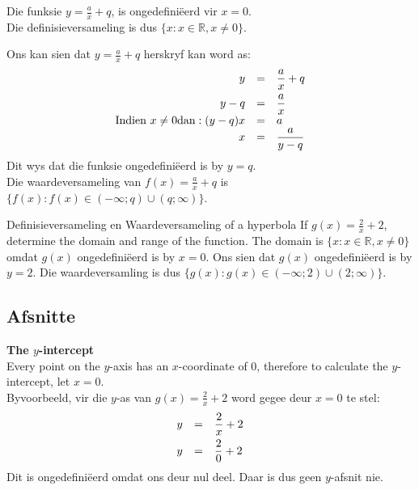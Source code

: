 Die funksie $y=\frac{a}{x}+q$, is ongedefiniëerd vir $x=0$. \\
Die definisieversameling is dus $\{x:x\in \mathbb{R},x\ne 0\}$.\par 
Ons kan sien dat $y=\frac{a}{x}+q$ herskryf kan word as:
\begin{equation*}
\begin{array}{ccl}\hfill y& =& \dfrac{a}{x}+q\hfill \vspace{4pt} \\
 \hfill y-q& =& \dfrac{a}{x}\hfill \\
 \hfill \mbox{Indien }x \ne  0 \mbox{dan}:(y-q)x& =& a\hfill \\
 \hfill x& =& \dfrac{a}{y-q}\hfill 
\end{array}
\end{equation*}
Dit wys dat die funksie ongedefiniëerd is by $y=q$. \\
Die waardeversameling van $f(x)=\frac{a}{x}+q$ is $\{f(x):f(x)\in (-\infty ;q)\cup (q;\infty )\}$.\par 

\begin{wex}{Definisieversameling en Waardeversameling of a hyperbola}
{If $g(x)=\frac{2}{x}+2$, determine the domain and range of the function.}
{
The domain is $\{x:x\in \mathbb{R},x\ne 0\}$ omdat $g(x)$ ongedefiniëerd is by $x=0$.
Ons sien dat  $g(x)$ ongedefiniëerd is by $y=2$.  Die waardeversamling is dus $\{g(x):g(x)\in (-\infty ;2)\cup (2;\infty )\}$.
}
\end{wex}


\subsection*{Afsnitte}

\textbf{The $y$-intercept} \\
Every point on the $y$-axis has an $x$-coordinate of $0$, therefore to calculate the $y$-intercept, let $x=0$.\\
Byvoorbeeld, vir die $y$-as van $g(x)=\frac{2}{x}+2$ word gegee deur $x=0$ te stel:
\begin{equation*}
\begin{array}{ccc}\hfill y& =& \dfrac{2}{x}+2\hfill \vspace{4pt}\\
 \hfill y& =& \dfrac{2}{0}+2\hfill 
\end{array}
\end{equation*}
Dit is ongedefiniëerd omdat ons deur nul deel. Daar is dus geen $y$-afsnit nie.\\
\\

